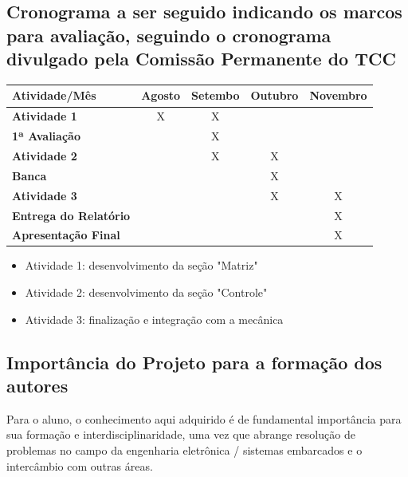 \documentclass[a4paper,12pt]{article}
\begin{document}
\subsection{Cronograma a ser seguido indicando os marcos para avaliação, seguindo o cronograma divulgado pela Comissão Permanente do TCC}

\begin{table}[H]
\begin{tabular}{|l|c|c|c|c|}
\hline
\textbf{Atividade/Mês}        & \textbf{Agosto} & \textbf{Setembo} & \textbf{Outubro} & \textbf{Novembro} \\ \hline
\textbf{Atividade 1}          & X               & X                &                  &                   \\ \hline
\textbf{1ª Avaliação}         &                 & X                &                  &                   \\ \hline
\textbf{Atividade 2}          &                 & X                & X                &                   \\ \hline
\textbf{Banca}                &                 &                  & X                &                   \\ \hline
\textbf{Atividade 3}          &                 &                  & X                & X                 \\ \hline
\textbf{Entrega do Relatório} &                 &                  &                  & X                 \\ \hline
\textbf{Apresentação Final}   &                 &                  &                  & X                 \\ \hline
\end{tabular}
\end{table}

\begin{itemize}
    \item Atividade 1: desenvolvimento da seção "Matriz" 
    \item Atividade 2: desenvolvimento da seção "Controle"
    \item Atividade 3: finalização e integração com a mecânica
\end{itemize}

\subsection{Importância do Projeto para a formação dos autores}
Para o aluno, o conhecimento aqui adquirido é de fundamental importância para sua formação e interdisciplinaridade, uma vez que abrange resolução de problemas no campo da engenharia eletrônica / sistemas embarcados e o intercâmbio com outras áreas.
\end{document}
